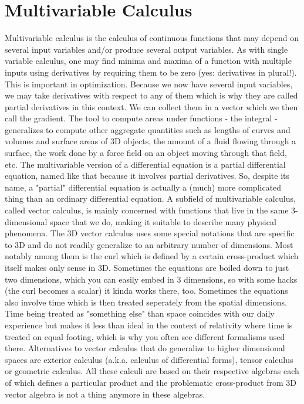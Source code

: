 \documentclass[12pt]{book}  %
\begin{document}
\chapter{Multivariable Calculus}
Multivariable calculus is the calculus of continuous functions that may depend on several input variables and/or produce several output variables. As with single variable calculus, one may find minima and maxima of a function with multiple inputs using derivatives by requiring them to be zero (yes: derivatives in plural!). This is important in optimization. Because we now have several input variables, we may take derivatives with respect to any of them which is why they are called partial derivatives in this context. We can collect them in a vector which we then call the gradient. The tool to compute areas under functions - the integral - generalizes to compute other aggregate quantities such as lengths of curves and volumes and surface areas of 3D objects, the amount of a fluid flowing through a surface, the work done by a force field on an object moving through that field, etc. The multivariable version of a differential equation is a partial differential equation, named like that because it involves partial derivatives. So, despite its name, a "partial" differential equation is actually a (much) more complicated thing than an ordinary differential equation. A subfield of multivariable calculus, called vector calculus, is mainly concerned with functions that live in the same 3-dimensional space that we do, making it suitable to describe many physical phenomena. The 3D vector calculus uses some special notations that are specific to 3D and do not readily generalize to an arbitrary number of dimensions. Most notably among them is the curl which is defined by a certain cross-product which itself makes only sense in 3D. Sometimes the equations are boiled down to just two dimensions, which you can easily embed in 3 dimensions, so with some hacks (the curl becomes a scalar) it kinda works there, too. Sometimes the equations also involve time which is then treated seperately from the spatial dimensions. Time being treated as "something else" than space coincides with our daily experience but makes it less than ideal in the context of relativity where time is treated on equal footing, which is why you often see different formalisms used there. Alternatives to vector calculus that do generalize to higher dimensional spaces are exterior calculus (a.k.a. calculus of differential forms), tensor calculus or geometric calculus. All these calculi are based on their respective algebras each of which defines a particular product and the problematic cross-product from 3D vector algebra is not a thing anymore in these algebras.
\end{document}
